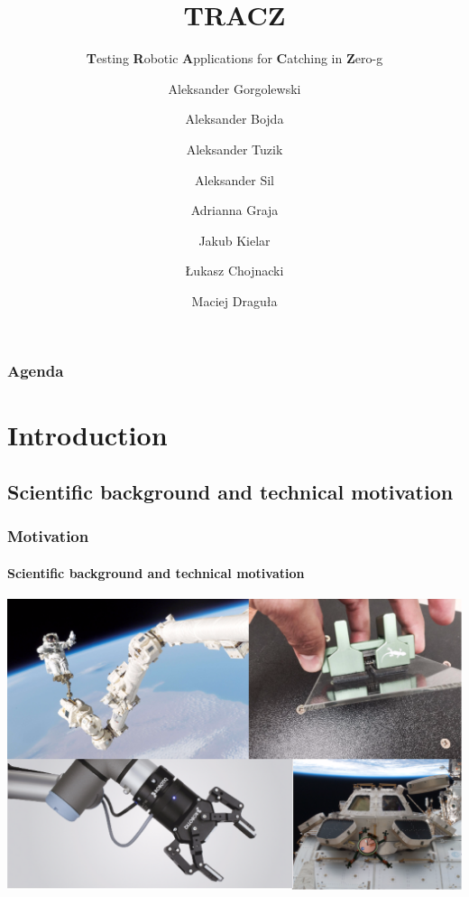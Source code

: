 \documentclass[xcolor=dvipsnames]{beamer}%
\title[ESTEC, Noordwijk]{\textbf{TRACZ}}
\subtitle{\textbf{T}esting \textbf{R}obotic  \textbf{A}pplications for \textbf{C}atching in \textbf{Z}ero-g}
\author[Team TRACZ]{Aleksander Gorgolewski \and Aleksander Bojda \and Aleksander Tuzik \and Aleksander Sil \and Adrianna Graja \and Jakub Kielar \and Łukasz Chojnacki \and Maciej Draguła}
\institute[WUST \& UWr]{Wroclaw University of Science and Technology \and University of Wroclaw}
\begin{document}
\begin{frame}
\maketitle
\end{frame}


\begin{frame}
\frametitle{Agenda}
\tableofcontents
\end{frame}


\section{Introduction}

\subsection{Scientific background and technical motivation}        
\begin{frame} %
\frametitle{Motivation}
\framesubtitle{Scientific background and technical motivation} %

\includegraphics[width=\textwidth]{figure/motivation.png}
\centering   %


\end{frame}
\end{document}
